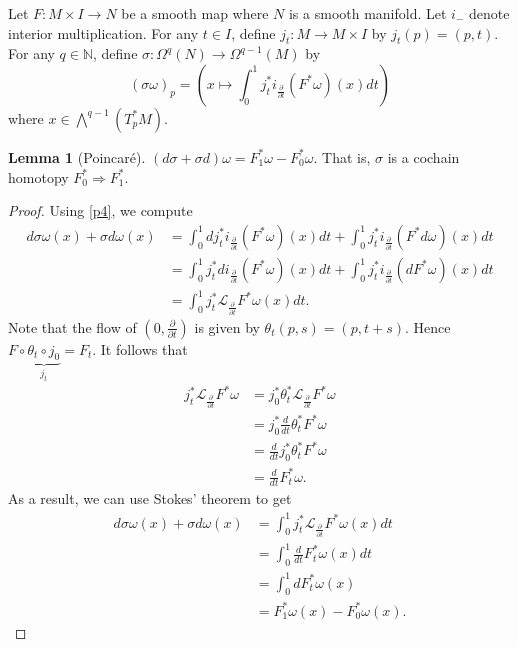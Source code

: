 \documentclass[10pt,letterpaper,cm]{nupset}
\theoremstyle{definition}
\theoremstyle{theorem}
\newtheorem{lemma}[definition]{Lemma}
\theoremstyle{remark}
\newcommand{\N}{\mathbb N}
\newcommand{\1}{\mathbb{1}}
\newcommand{\0}{\vec 0}
\begin{document}
\medskip

 Let $F: M \times I \to N$ be a smooth map where $N$ is a smooth manifold. Let $i_{{-}}$ denote interior multiplication. 
 For any $t\in I$, define $j_t: M \to M\times I$ by $j_t(p) = (p,t)$.
 For any $q\in \N$, define $\sigma  : \Omega^q(N) \to \Omega^{q-1}(M)$ by $$\left(\sigma{\omega}\right)_p = \left(x \mapsto \int_0^1 j_t^{\ast}i_{\frac{\partial}{\partial{t}}}(F^{\ast}{\omega})(x) dt\right)$$ where $x\in \bigwedge^{q-1}(T_p^{\ast}{M})$. 

\begin{lemma}[Poincar\'e]\label{Poin}
$(d\sigma + \sigma d)\omega = F_1^{\ast} \omega - F_0^{\ast}\omega$. That is, $\sigma$ is a cochain homotopy $F^{\ast}_0 \Rightarrow F^{\ast}_1$.
\end{lemma}
\begin{proof}
Using \cref{p4}, we compute
\begin{align*}
d\sigma \omega(x) + \sigma d \omega(x) & =  \int_0^1 dj_t^{\ast}i_{\frac{\partial}{\partial{t}}}(F^{\ast}{\omega})(x) dt + \int_0^1j_t^{\ast} i_{\frac{\partial}{\partial{t}}}(F^{\ast}{d\omega})(x) dt
\\ & =   \int_0^1 j_t^{\ast}di_{\frac{\partial}{\partial{t}}}(F^{\ast}{\omega})(x) dt + \int_0^1 j_t^{\ast}i_{\frac{\partial}{\partial{t}}}(dF^{\ast}{\omega})(x) dt
\\ & = \int_0^1 j_t^{\ast}\mathcal{L}_{\frac{\partial}{\partial{t}}}{F^{\ast}{\omega}}(x)dt
 . \end{align*} Note that the flow of $\left(0, \frac{\partial}{\partial{t}}\right)$ is given by $\theta_t(p,s) = (p, t+s)$. Hence $F \circ \underbrace{\theta_t \circ j_0}_{j_t} = F_t$. It follows that
\begin{align*}
j_t^{\ast}\mathcal{L}_{\frac{\partial}{\partial{t}}}{F^{\ast}{\omega}}
& = j_0^{\ast} \theta_t^{\ast}\mathcal{L}_{\frac{\partial}{\partial{t}}}{F^{\ast}{\omega}}
\\ & =  j_0^{\ast}\frac{d}{dt}\theta_t^{\ast}F^{\ast}\omega
\\ & = \frac{d}{dt}j_0^{\ast}\theta_t^{\ast}F^{\ast}\omega
\\ & = \frac{d}{dt}F_t^{\ast}{\omega}
. \end{align*}
 As a result, we can use Stokes' theorem to get
  \begin{align*}
d\sigma \omega(x) + \sigma d \omega(x) & =  \int_0^1 j_t^{\ast}\mathcal{L}_{\frac{\partial}{\partial{t}}}{F^{\ast}{\omega}}(x)dt
\\ & = \int_0^1 \frac{d}{dt}F_t^{\ast}{\omega}(x)dt
\\ & = \int_0^1 dF_t^{\ast}{\omega}(x)
\\ & = F^{\ast}_1{\omega}(x) - F^{\ast}_0{\omega}(x)
 . \end{align*}
\end{proof}
\end{document}
